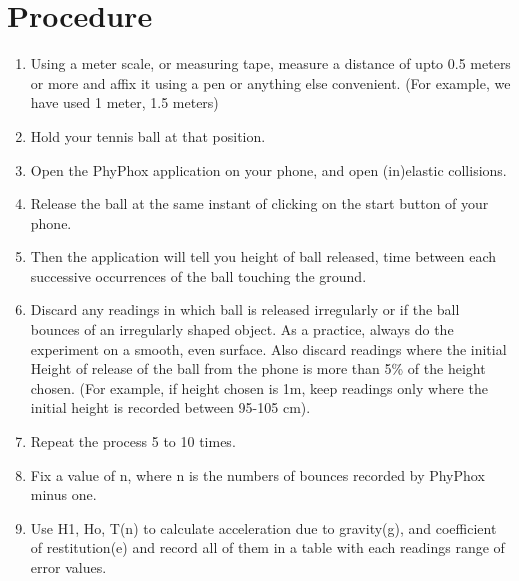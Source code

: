 \documentclass{article}
\begin{document}
\begin{sloppypar}
\section{Procedure}
\begin{enumerate}
    \item Using a meter scale, or measuring tape, measure a distance of upto 0.5 meters or more and affix it using a pen or anything else convenient. (For example, we have used 1 meter, 1.5 meters)
    \item Hold your tennis ball at that position.
    \item Open the PhyPhox application on your phone, and open (in)elastic collisions.
    \item Release the ball at the same instant of clicking on the start button of your phone.
    \item Then the application will tell you height of ball released, time between each successive occurrences of the ball touching the ground.
    \item Discard any readings in which ball is released irregularly or if the ball bounces of an irregularly shaped object. As a practice, always do the experiment on a smooth, even surface. Also discard readings where the initial Height of release of the ball from the phone is more than 5\% of the height chosen. (For example, if height chosen is 1m, keep readings only where the initial height is recorded between 95-105 cm).
    \item Repeat the process 5 to 10 times.
    \item Fix a value of n, where n is the numbers of bounces recorded by PhyPhox minus one.
    \item Use H1, Ho, T(n) to calculate acceleration due to gravity(g), and coefficient of restitution(e) and record all of them in a table with each readings range of error values.


\end{enumerate}







\end{sloppypar}
\end{document}
